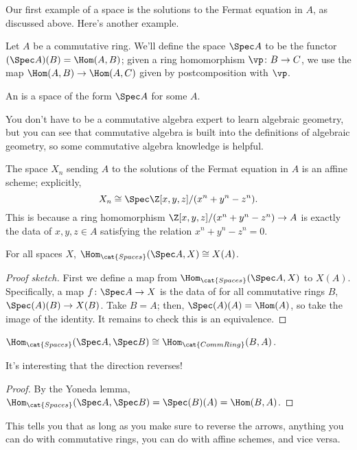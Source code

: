 Our first example of a space is the solutions to the Fermat equation in $A$, as discussed above. Here's another
example.
\begin{exm}
Let $A$ be a commutative ring. We'll define the space $\Spec A$ to be the functor $(\Spec A)(B) = \Hom(A, B)$;
given a ring homomorphism $\vp\colon B\to C$, we use the map $\Hom(A,B)\to\Hom(A,C)$ given by postcomposition with
$\vp$.
\end{exm}
\begin{defn}
An  is a space of the form $\Spec A$ for some $A$.
\end{defn}
You don't have to be a commutative algebra expert to learn algebraic geometry, but you can see that commutative
algebra is built into the definitions of algebraic geometry, so some commutative algebra knowledge is helpful.
\begin{exm}
The space $X_n$ sending $A$ to the solutions of the Fermat equation in $A$ is an affine scheme; explicitly,
\[X_n\cong \Spec \Z[x,y,z]/(x^n+y^n-z^n).\]
This is because a ring homomorphism $\Z[x,y,z]/(x^n+y^n-z^n)\to A$ is exactly the data of $x,y,z\in A$ satisfying
the relation $x^n+y^n-z^n = 0$.
\end{exm}
\begin{lem}
For all spaces $X$, $\Hom_{\cat{Spaces}}(\Spec A, X)\cong X(A)$.
\end{lem}
\begin{proof}[Proof sketch]
First we define a map from $\Hom_{\cat{Spaces}}(\Spec A, X)$ to $X(A)$. Specifically, a map $f\colon\Spec A\to X$
is the data of for all commutative rings $B$, $\Spec(A)(B)\to X(B)$. Take $B = A$; then, $\Spec(A)(A) = \Hom(A)$,
so take the image of the identity. It remains to check this is an equivalence.
\end{proof}
\begin{cor}
$\Hom_{\cat{Spaces}}(\Spec A, \Spec B)\cong\Hom_{\cat{CommRing}}(B, A)$.
\end{cor}
It's interesting that the direction reverses!
\begin{proof}
By the Yoneda lemma, $\Hom_{\cat{Spaces}}(\Spec A, \Spec B) = \Spec(B)(A) = \Hom(B,A)$.
\end{proof}
This tells you that as long as you make sure to reverse the arrows, anything you can do with commutative rings, you
can do with affine schemes, and vice versa.
